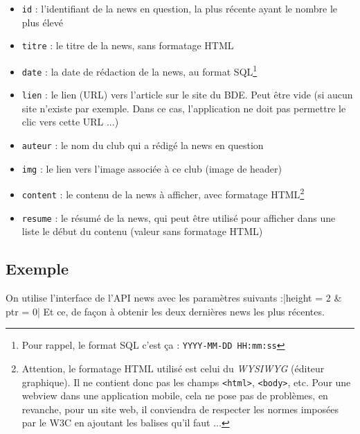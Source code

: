 \documentclass[12pt,a4paper,oneside]{report}
\begin{document}
\begin{itemize}
\item \texttt{id} : l'identifiant de la news en question, la plus récente ayant le nombre le plus élevé
\item \texttt{titre} : le titre de la news, sans formatage HTML
\item \texttt{date} : la date de rédaction de la news, au format SQL\footnote{Pour rappel, le format SQL c'est ça : \texttt{YYYY-MM-DD HH:mm:ss}}
\item \texttt{lien} : le lien (URL) vers l'article sur le site du BDE. Peut être vide (si aucun site n'existe par exemple. Dans ce cas, l'application ne doit pas permettre le clic vers cette URL ...)
\item \texttt{auteur} : le nom du club qui a rédigé la news en question
\item \texttt{img} : le lien vers l'image associée à ce club (image de header)
\item \texttt{content} : le contenu de la news à afficher, avec formatage HTML\footnote{Attention, le formatage HTML utilisé est celui du \textsl{WYSIWYG} (éditeur graphique). Il ne contient donc pas les champs \texttt{<html>}, \texttt{<body>}, etc. Pour une webview dans une application mobile, cela ne pose pas de problèmes, en revanche, pour un site web, il conviendra de respecter les normes imposées par le W3C en ajoutant les balises qu'il faut ...}
\item \texttt{resume} : le résumé de la news, qui peut être utilisé pour afficher dans une liste le début du contenu (valeur sans formatage HTML)

\end{itemize}

\subsection{Exemple}

On utilise l'interface de l'API news avec les paramètres suivants :|height = 2 & ptr = 0| Et ce, de façon à obtenir les deux dernières news les plus récentes.
\end{document}
